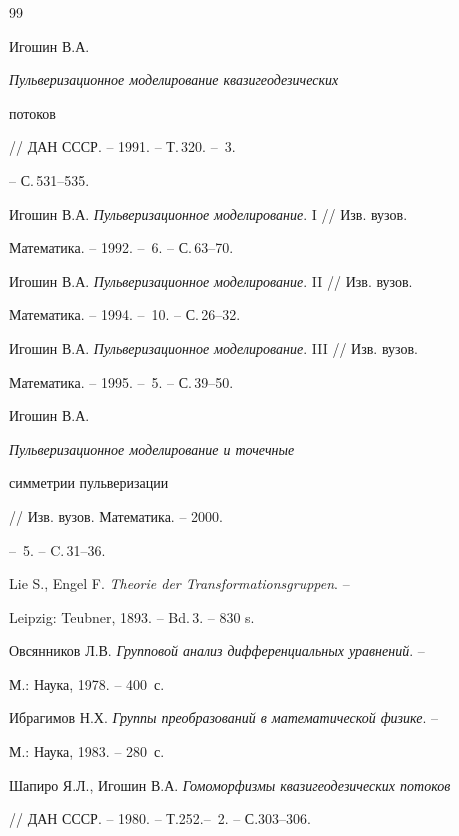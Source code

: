 \begin{thebibliography}{99} 


 




Игошин В.А. {\em Пульверизационное моделирование квазигеодезических 


потоков} // ДАН СССР. -- 1991. -- Т.\,320. -- \No\,3. 


-- С.\,531--535. 




Игошин В.А. {\em Пульверизационное моделирование}. I // Изв. вузов. 


Математика. -- 1992. -- \No\,6. -- С.\,63--70. 




Игошин В.А. {\em Пульверизационное моделирование}. II // Изв. вузов. 


Математика. -- 1994. -- \No\,10. -- С.\,26--32. 




Игошин В.А. {\em Пульверизационное моделирование}. III // Изв. вузов. 


Математика. -- 1995. -- \No\,5. -- С.\,39--50. 




Игошин В.А. {\em Пульверизационное моделирование и точечные 


симметрии пульверизации} // Изв. вузов. Математика. -- 2000. 


-- \No\,5. -- C.\,31--36. 




Lie S., Engel F. {\em Theorie der Transformationsgruppen}. -- 


Leipzig: Teubner, 1893. -- Bd.\,3. -- 830 s. 




Овсянников Л.В. {\em Групповой анализ дифференциальных уравнений}. -- 


М.: Наука, 1978. -- 400~с. 




Ибрагимов Н.Х. {\em Группы преобразований в математической физике}. -- 


М.: Наука, 1983. -- 280~с. 




Шапиро Я.Л., Игошин В.А. {\em Гомоморфизмы квазигеодезических потоков} 


// ДАН СССР. -- 1980. -- Т.252.--\No\, 2. -- С.303--306. 



\end{thebibliography}
